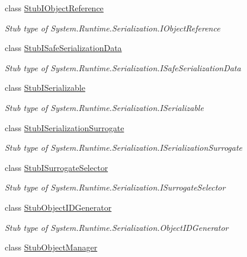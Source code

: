 \begin{DoxyCompactItemize}
class \hyperlink{class_system_1_1_runtime_1_1_serialization_1_1_fakes_1_1_stub_i_object_reference}{Stub\-I\-Object\-Reference}
\begin{DoxyCompactList}\small\item\em Stub type of System.\-Runtime.\-Serialization.\-I\-Object\-Reference\end{DoxyCompactList}\item 
class \hyperlink{class_system_1_1_runtime_1_1_serialization_1_1_fakes_1_1_stub_i_safe_serialization_data}{Stub\-I\-Safe\-Serialization\-Data}
\begin{DoxyCompactList}\small\item\em Stub type of System.\-Runtime.\-Serialization.\-I\-Safe\-Serialization\-Data\end{DoxyCompactList}\item 
class \hyperlink{class_system_1_1_runtime_1_1_serialization_1_1_fakes_1_1_stub_i_serializable}{Stub\-I\-Serializable}
\begin{DoxyCompactList}\small\item\em Stub type of System.\-Runtime.\-Serialization.\-I\-Serializable\end{DoxyCompactList}\item 
class \hyperlink{class_system_1_1_runtime_1_1_serialization_1_1_fakes_1_1_stub_i_serialization_surrogate}{Stub\-I\-Serialization\-Surrogate}
\begin{DoxyCompactList}\small\item\em Stub type of System.\-Runtime.\-Serialization.\-I\-Serialization\-Surrogate\end{DoxyCompactList}\item 
class \hyperlink{class_system_1_1_runtime_1_1_serialization_1_1_fakes_1_1_stub_i_surrogate_selector}{Stub\-I\-Surrogate\-Selector}
\begin{DoxyCompactList}\small\item\em Stub type of System.\-Runtime.\-Serialization.\-I\-Surrogate\-Selector\end{DoxyCompactList}\item 
class \hyperlink{class_system_1_1_runtime_1_1_serialization_1_1_fakes_1_1_stub_object_i_d_generator}{Stub\-Object\-I\-D\-Generator}
\begin{DoxyCompactList}\small\item\em Stub type of System.\-Runtime.\-Serialization.\-Object\-I\-D\-Generator\end{DoxyCompactList}\item 
class \hyperlink{class_system_1_1_runtime_1_1_serialization_1_1_fakes_1_1_stub_object_manager}{Stub\-Object\-Manager}

\end{DoxyCompactItemize}
